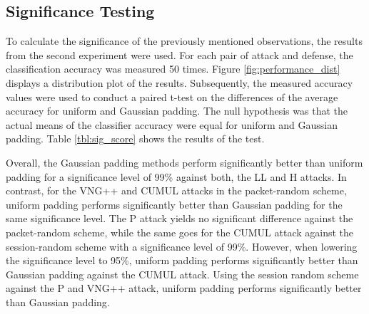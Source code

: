 \documentclass[
	ruledheaders=chapter,
	class=report,
	thesis={type=master, department=inf},
	accentcolor=1c,
	custommargins=true,
	marginpar=false,
	parskip=half-,
	fontsize=11pt,
]{tudapub}
\begin{document}
	\subsection{Significance Testing}
	\label{results:sig_score}
	
	To calculate the significance of the previously mentioned observations, the results from the second experiment were used. For each pair of attack and defense, the classification accuracy was measured 50 times. Figure \ref{fig:performance_dist} displays a distribution plot of the results. Subsequently, the measured accuracy values were used to conduct a paired t-test on the differences of the average accuracy for uniform and Gaussian padding. The null hypothesis was that the actual means of the classifier accuracy were equal for uniform and Gaussian padding. Table \ref{tbl:sig_score} shows the results of the test.
	
	Overall, the Gaussian padding methods perform significantly better than uniform padding for a significance level of 99\% against both, the LL and H attacks. In contrast, for the VNG++ and CUMUL attacks in the packet-random scheme, uniform padding performs significantly better than Gaussian padding for the same significance level. The P attack yields no significant difference against the packet-random scheme, while the same goes for the CUMUL attack against the session-random scheme with a significance level of 99\%. However, when lowering the significance level to 95\%, uniform padding performs significantly better than Gaussian padding against the CUMUL attack. Using the session random scheme against the P and VNG++ attack, uniform padding performs significantly better than Gaussian padding.
		
\end{document}
